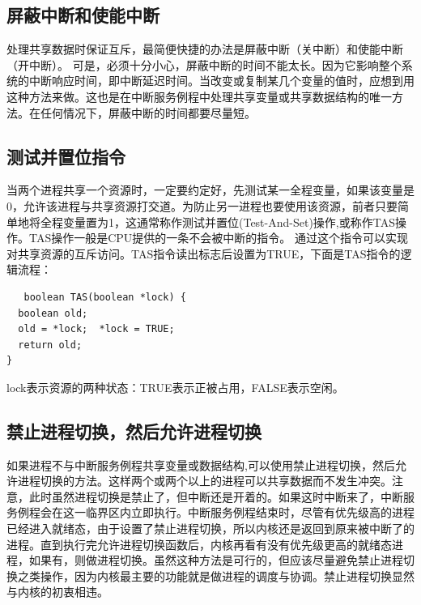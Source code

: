 \documentclass[a4paper,12pt]{report}
\begin{document}
\begin{appendix}
\subsection{   屏蔽中断和使能中断}
\begin{spacing}{1.5}
   处理共享数据时保证互斥，最简便快捷的办法是屏蔽中断（关中断）和使能中断（开中断）。 可是，必须十分小心，屏蔽中断的时间不能太长。因为它影响整个系统的中断响应时间，即中断延迟时间。当改变或复制某几个变量的值时，应想到用这种方法来做。这也是在中断服务例程中处理共享变量或共享数据结构的唯一方法。在任何情况下，屏蔽中断的时间都要尽量短。

\end{spacing}
\subsection{   测试并置位指令}
\begin{spacing}{1.5}
   当两个进程共享一个资源时，一定要约定好，先测试某一全程变量，如果该变量是0，允许该进程与共享资源打交道。为防止另一进程也要使用该资源，前者只要简 单地将全程变量置为1，这通常称作测试并置位(Test-And-Set)操作,或称作TAS操作。TAS操作一般是CPU提供的一条不会被中断的指令。 通过这个指令可以实现对共享资源的互斥访问。TAS指令读出标志后设置为TRUE，下面是TAS指令的逻辑流程：
   \begin{lstlisting}
   boolean TAS(boolean *lock) {
  boolean old;
  old = *lock;  *lock = TRUE;
  return old;
}

   \end{lstlisting}
   lock表示资源的两种状态：TRUE表示正被占用，FALSE表示空闲。
\end{spacing}


\subsection{   禁止进程切换，然后允许进程切换}
\begin{spacing}{1.5}
 如果进程不与中断服务例程共享变量或数据结构,可以使用禁止进程切换，然后允许进程切换的方法。这样两个或两个以上的进程可以共享数据而不发生冲突。注 意，此时虽然进程切换是禁止了，但中断还是开着的。如果这时中断来了，中断服务例程会在这一临界区内立即执行。中断服务例程结束时，尽管有优先级高的进程 已经进入就绪态，由于设置了禁止进程切换，所以内核还是返回到原来被中断了的进程。直到执行完允许进程切换函数后，内核再看有没有优先级更高的就绪态进 程，如果有，则做进程切换。虽然这种方法是可行的，但应该尽量避免禁止进程切换之类操作，因为内核最主要的功能就是做进程的调度与协调。禁止进程切换显然 与内核的初衷相违。
\end{spacing}


\end{appendix}
\end{document}
